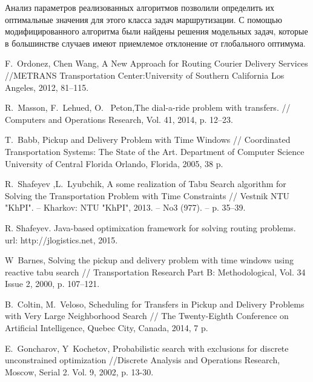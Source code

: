 \documentclass[]{TAACpaper}
\begin{document}
Анализ параметров реализованных алгоритмов позволили определить их оптимальные значения для этого класса задач маршрутизации. С помощью модифицированного алгоритма были найдены решения модельных задач, которые в большинстве случаев имеют приемлемое отклонение от глобального оптимума.




\begin{thebibliography}{99}

 F.~Ordonez, Chen Wang, A New Approach for Routing Courier Delivery Services //METRANS Transportation Center:University of Southern California
Los Angeles,  2012, 81--115.

 R.~Masson, F.~Lehued, O.~ Peton,The dial-a-ride problem with transfers. // Computers and Operations Research, Vol. 41, 2014, p. 12--23.

 T.~Babb, Pickup and Delivery Problem with Time Windows // Coordinated Transportation Systems: The State of the Art. Department of Computer Science University of Central Florida Orlando, Florida, 2005, 38 p.

 R.~Shafeyev ,L.~Lyubchik, A some realization of Tabu Search algorithm for Solving the Transportation Problem with Time Constraints // Vestnik NTU "KhPI". – Kharkov: NTU
"KhPI", 2013. – No3 (977). – p. 35–39.

  R. Shafeyev. Java-based optimixation framework for solving routing problems.\\ url: http://jlogistics.net, 2015.

 W~Barnes, Solving the pickup and delivery problem with time windows using reactive tabu search // Transportation Research Part B: Methodological, Vol. 34 Issue 2, 2000, p. 107--121.

 B.~Coltin, M.~Veloso, Scheduling for Transfers in Pickup and Delivery Problems with Very Large Neighborhood Search // The Twenty-Eighth Conference on Artificial Intelligence, Quebec City, Canada, 2014, 7 p.

 E.~Goncharov, Y~Kochetov, Probabilistic search with exclusions for discrete unconstrained optimization  //Discrete Analysis and Operations Research, Moscow, Serial 2. Vol. 9, 2002, p. 13-30.


\end{thebibliography}
\end{document}
